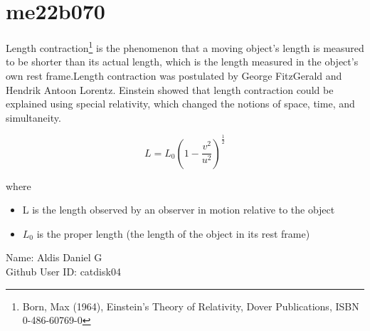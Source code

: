 \section{me22b070}

Length contraction\footnote{ Born, Max (1964), Einstein's Theory of Relativity, Dover Publications, ISBN 0-486-60769-0}
is the phenomenon that a moving object's length is measured to be shorter than its actual length, which is 
the length measured in the object's own rest frame.Length contraction was postulated by George FitzGerald
and Hendrik Antoon Lorentz. Einstein showed that length contraction could be explained using special 
relativity, which changed the notions of space, time, and simultaneity.

\begin{equation}
	L=L_0(1-\frac{v^2}{u^2})^\frac{1}{2}
\end{equation}

where 
\begin{itemize}
	\item L is the length observed by an observer in motion relative to the object
	\item $L_0$ is the proper length (the length of the object in its rest frame)
\end{itemize}

\begin{flushleft}
Name: Aldis Daniel G\\
Github User ID: catdisk04
\end{flushleft}
